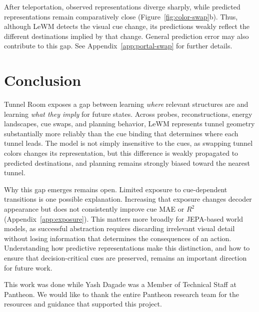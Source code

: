 \documentclass{article}
\begin{document}
After teleportation, observed representations
diverge sharply, while predicted representations remain comparatively close
(Figure~\ref{fig:color-swap}b). Thus, although
LeWM detects the visual cue change, its predictions weakly reflect the
different destinations implied by that change. General prediction error may
also contribute to this gap. See Appendix~\ref{app:portal-swap} for further details.

\section{Conclusion}

Tunnel Room exposes a gap between learning \emph{where} relevant structures
are and learning \emph{what they imply} for future states. Across probes,
reconstructions, energy landscapes, cue swaps, and planning behavior, LeWM
represents tunnel geometry substantially more reliably than the cue binding
that determines where each tunnel leads. The model is not simply insensitive
to the cues, as swapping tunnel colors changes its representation, but this
difference is weakly propagated to predicted destinations, and planning
remains strongly biased toward the nearest tunnel.

Why this gap emerges remains open. Limited exposure to cue-dependent
transitions is one possible explanation. Increasing that exposure changes
decoder appearance but does not consistently improve cue MAE or $R^2$
(Appendix~\ref{app:exposure}). This matters more broadly for JEPA-based world
models, as successful abstraction requires discarding irrelevant visual detail
without losing information that determines the consequences of an action.
Understanding how predictive representations make this distinction, and how
to ensure that decision-critical cues are preserved, remains an important
direction for future work.

\clearpage

\begin{ack}
This work was done while Yash Dagade was a Member of Technical Staff at Pantheon.
We would like to thank the entire Pantheon research team for the resources and guidance that supported this project.
\end{ack}

\begingroup
\small


\endgroup

\appendix


\FloatBarrier





\FloatBarrier


\FloatBarrier

\end{document}
